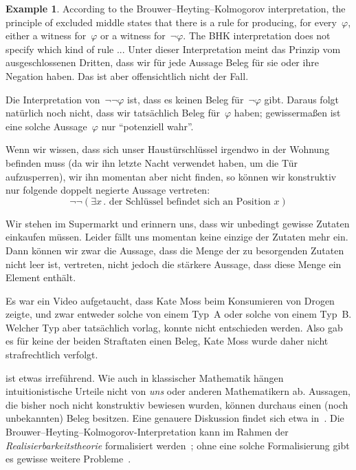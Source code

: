\documentclass[10pt,reqno,a4paper,openany]{amsbook}
\theoremstyle{definition}
\newtheorem{ex}[defn]{Example}
\theoremstyle{plain}
\theoremstyle{remark}
\newcommand{\?}{\,{:}\,}
\renewcommand{\_}{\mathpunct{.}\,}
\begin{document}
\begin{ex}
According to the Brouwer--Heyting--Kolmogorov interpretation, the principle of
excluded middle states that there is a rule for producing, for every~$\varphi$,
either a witness for~$\varphi$ or a witness for~$\neg\varphi$. The BHK
interpretation does not specify which kind of rule ...
Unter dieser Interpretation meint das Prinzip vom ausgeschlossenen Dritten, dass wir für jede
Aussage Beleg für sie oder ihre Negation haben. Das ist aber offensichtlich
nicht der Fall.
\end{ex}

Die Interpretation von~$\neg\neg\varphi$ ist, dass es keinen Beleg
für~$\neg\varphi$ gibt. Daraus folgt natürlich noch nicht, dass wir tatsächlich
Beleg für~$\varphi$ haben; gewissermaßen ist eine solche Aussage~$\varphi$ nur
"`potenziell wahr"'.

Wenn wir wissen, dass sich unser Haustürschlüssel irgendwo in der
Wohnung befinden muss (da wir ihn letzte Nacht verwendet haben, um die Tür
aufzusperren), wir ihn momentan aber nicht finden, so können wir konstruktiv
nur folgende doppelt negierte Aussage vertreten:
\[ \neg\neg (\exists x\_ \text{der Schlüssel befindet sich an Position~$x$})
\]

Wir stehen im Supermarkt und erinnern uns, dass wir unbedingt
gewisse Zutaten einkaufen müssen. Leider fällt uns momentan keine einzige der
Zutaten mehr ein. Dann können wir zwar die Aussage, dass die Menge der zu
besorgenden Zutaten nicht leer ist, vertreten, nicht jedoch die stärkere
Aussage, dass diese Menge ein Element enthält.

Es war ein Video aufgetaucht, dass Kate Moss beim Konsumieren von Drogen zeigte,
und zwar entweder solche von einem Typ~A oder solche von einem Typ~B. Welcher
Typ aber tatsächlich vorlag, konnte nicht entschieden werden. Also gab es für
keine der beiden Straftaten einen Beleg, Kate Moss wurde daher nicht
strafrechtlich verfolgt.

ist etwas irreführend. Wie auch in klassischer Mathematik hängen
intuitionistische Urteile nicht von \emph{uns} oder anderen Mathematikern ab.
Aussagen, die bisher noch nicht konstruktiv bewiesen wurden, können
durchaus einen (noch unbekannten) Beleg besitzen. Eine genauere Diskussion
findet sich etwa in~\cite[Seite~42f.]{kohlenbach:applprooftheory}. Die
Brouwer--Heyting--Kolmogorov-Interpretation kann im Rahmen der
\emph{Realisierbarkeitstheorie} formalisiert werden~\cite{bauer:realizability};
ohne eine solche Formalisierung gibt es gewisse weitere
Probleme~\cite{artemov:bhk,sanz-piecha:critical-bhk,dalen:bhk}.
\end{document}
